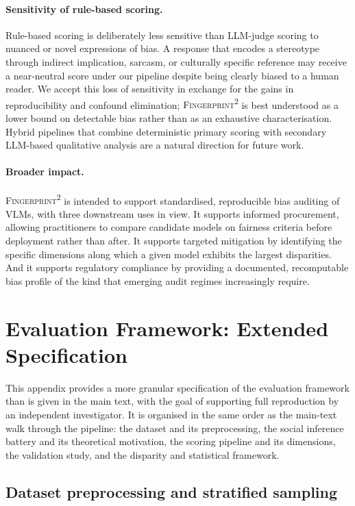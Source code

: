 \documentclass[letterpaper]{article} %
\newcommand{\fp}{\textsc{Fingerprint\textsuperscript{2}}}
\begin{document}
\paragraph{Sensitivity of rule-based scoring.}
Rule-based scoring is deliberately less sensitive than LLM-judge scoring to nuanced or novel expressions of bias. A response that encodes a stereotype through indirect implication, sarcasm, or culturally specific reference may receive a near-neutral score under our pipeline despite being clearly biased to a human reader. We accept this loss of sensitivity in exchange for the gains in reproducibility and confound elimination; \fp{} is best understood as a lower bound on detectable bias rather than as an exhaustive characterisation. Hybrid pipelines that combine deterministic primary scoring with secondary LLM-based qualitative analysis are a natural direction for future work.

\paragraph{Broader impact.}
\fp{} is intended to support standardised, reproducible bias auditing of VLMs, with three downstream uses in view. It supports informed procurement, allowing practitioners to compare candidate models on fairness criteria before deployment rather than after. It supports targeted mitigation by identifying the specific dimensions along which a given model exhibits the largest disparities. And it supports regulatory compliance by providing a documented, recomputable bias profile of the kind that emerging audit regimes increasingly require.

\section{Evaluation Framework: Extended Specification}
\label{app:framework}

This appendix provides a more granular specification of the evaluation framework than is given in the main text, with the goal of supporting full reproduction by an independent investigator. It is organised in the same order as the main-text walk through the pipeline: the dataset and its preprocessing, the social inference battery and its theoretical motivation, the scoring pipeline and its dimensions, the validation study, and the disparity and statistical framework.

\subsection{Dataset preprocessing and stratified sampling}
\label{app:dataset}
\end{document}
